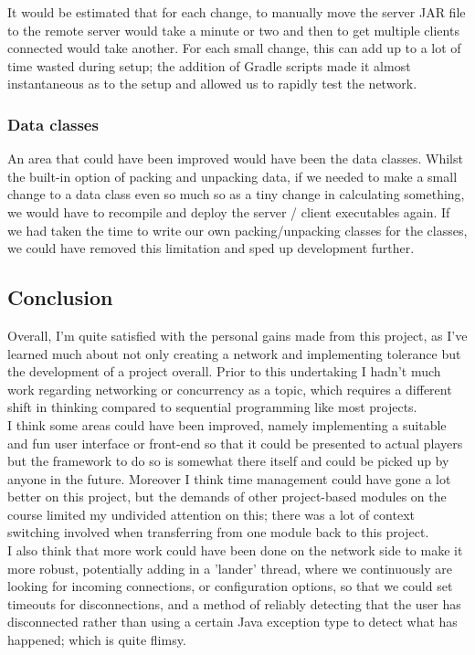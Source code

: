 \documentclass[11pt]{article}
\begin{document}
It would be estimated that for each change, to manually move the server JAR file to the remote server would take a minute or two and then to get multiple clients connected would take another. For each small change, this can add up to a lot of time wasted during setup; the addition of Gradle scripts made it almost instantaneous as to the setup and allowed us to rapidly test the network.

\subsubsection{Data classes}
An area that could have been improved would have been the data classes. Whilst the built-in option of packing and unpacking data, if we needed to make a small change to a data class even so much so as a tiny change in calculating something, we would have to recompile and deploy the server / client executables again. If we had taken the time to write our own packing/unpacking classes for the classes, we could have removed this limitation and sped up development further. 

\newpage
\subsection{Conclusion}

Overall, I'm quite satisfied with the personal gains made from this project, as I've learned much about not only creating a network and implementing tolerance but the development of a project overall. Prior to this undertaking I hadn't much work regarding networking or concurrency as a topic, which requires a different shift in thinking compared to sequential programming like most projects. \\

I think some areas could have been improved, namely implementing a suitable and fun user interface or front-end so that it could be presented to actual players but the framework to do so is somewhat there itself and could be picked up by anyone in the future. Moreover I think time management could have gone a lot better on this project, but the demands of other project-based modules on the course limited my undivided attention on this; there was a lot of context switching involved when transferring from one module back to this project.  \\

I also think that more work could have been done on the network side to make it more robust, potentially adding in a 'lander' thread, where we continuously are looking for incoming connections, or configuration options, so that we could set timeouts for disconnections, and a method of reliably detecting that the user has disconnected rather than using a certain Java exception type to detect what has happened; which is quite flimsy. 
\end{document}
